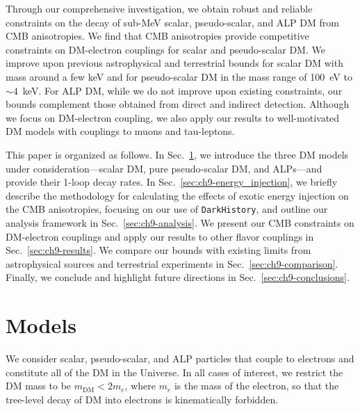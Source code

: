 Through our comprehensive investigation, we obtain robust and reliable constraints on the decay of sub-MeV scalar, pseudo-scalar, and ALP DM from CMB anisotropies.
We find that CMB anisotropies provide competitive constraints on DM-electron couplings for scalar and pseudo-scalar DM.
We improve upon previous astrophysical and terrestrial bounds for scalar DM with mass around a few keV and for pseudo-scalar DM in the mass range of 100~eV to $\sim 4$~keV.
For ALP DM, while we do not improve upon existing constraints, our bounds complement those obtained from direct and indirect detection.
Although we focus on DM-electron coupling, we also apply our results to well-motivated DM models with couplings to muons and tau-leptons.

This paper is organized as follows.
In Sec.~\ref{sec:ch9-models}, we introduce the three DM models under consideration---scalar DM, pure pseudo-scalar DM, and ALPs---and provide their 1-loop decay rates.
In Sec.~\ref{sec:ch9-energy_injection}, we briefly describe the methodology for calculating the effects of exotic energy injection on the CMB anisotropies, focusing on our use of \texttt{DarkHistory}, and outline our analysis framework in Sec.~\ref{sec:ch9-analysis}.
We present our CMB constraints on DM-electron couplings and apply our results to other flavor couplings in Sec.~\ref{sec:ch9-results}.
We compare our bounds with existing limits from astrophysical sources and terrestrial experiments in Sec.~\ref{sec:ch9-comparison}.
Finally, we conclude and highlight future directions in Sec.~\ref{sec:ch9-conclusions}.

\section{Models}
\label{sec:ch9-models}

We consider scalar, pseudo-scalar, and ALP particles that couple to electrons and constitute all of the DM in the Universe.
In all cases of interest, we restrict the DM mass to be $m_\mathrm{DM} < 2 m_e$, where $m_e$ is the mass of the electron, so that the tree-level decay of DM into electrons is kinematically forbidden.


